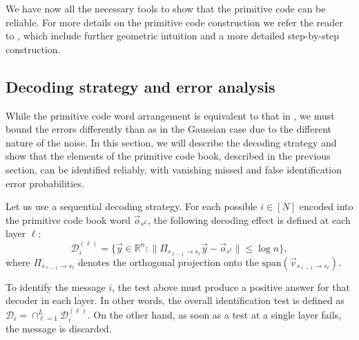 \documentclass[10pt, conference]{IEEEtran}
\newcommand{\1}{\mathds{1}}
\newcommand{\RR}{\mathbb{R}}
\newcommand{\cD}{\mathcal{D}}
\begin{document}
We have now all the necessary tools to show that the primitive code can be reliable. For more details on the primitive code construction we refer the reader to \cite[Sections II \& III]{CDBW:Gauss}, which include further geometric intuition and a more detailed step-by-step construction.










\subsection{Decoding strategy and error analysis}\label{ssec:error_analysis}
While the primitive code word arrangement is equivalent to that in \cite{CDBW:Gauss}, we must bound the errors differently than as in the Gaussian case due to the different nature of the noise. 
In this section, we will describe the decoding strategy and show that the elements of the primitive code book, described in the previous section, can be identified reliably, with vanishing missed and false identification error probabilities. 

Let us use a sequential decoding strategy. For each possible $i\in[N]$ encoded into the primitive code book word $\vec o_{s^L}$, the following decoding effect is defined at each layer $\ell$:
\begin{equation}\label{eq:layer-decoder}
\cD_{i}^{(\ell)}=\{\vec{y}\in\RR^n:\|\Pi_{s_{\ell-1}\to s_{\ell}}\vec{y}-\vec{o}_{s^\ell}\|\leq\log n\},
\end{equation}
where $\Pi_{s_{\ell-1}\to s_{\ell}}$ denotes the orthogonal projection onto the $\text{span}(\vec v_{s_{\ell-1}\to s_{\ell}})$. 

To identify the message $i$, the test above must produce a positive answer for that decoder in each layer. In other words, the overall identification test is defined as $\cD_i=\cap_{\ell=1}^L\cD_{i}^{(\ell)}$. On the other hand, as soon as a test at a single layer fails, the message is discarded.
\end{document}
